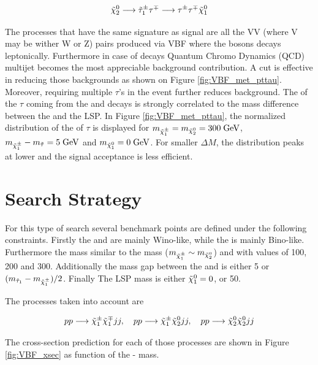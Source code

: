 \begin{equation}
\tilde{\chi}^{0}_{2} \longrightarrow \tilde{\tau}_{1}^{\pm} \tau^{\mp} \longrightarrow \tau^{\pm} \tau^{\mp} \tilde{\chi}^{0}_{1}
\end{equation}

The processes that have the same signature as signal are all the VV (where V may be wither W or Z) pairs produced via VBF where the bosons decays leptonically. Furthermore in case of \hadtau decays Quantum Chromo Dynamics (QCD) multijet becomes the most appreciable background contribution. A \met cut is eﬀective in reducing those backgrounds as shown on Figure \ref{fig:VBF_met_pttau}. Moreover, requiring multiple $\tau$’s in the event further reduces background. The \pt of the \ensuremath{\tau} coming from the \charginopm and \neutralinotwo decays is strongly correlated to the mass difference between the \charginopm and the \neutralinoone LSP. In Figure \ref{fig:VBF_met_pttau}, the normalized distribution of the \pt of \ensuremath{\tau} is displayed for \ensuremath{m_{\charginopm} = m_{\neutralinotwo} = 300\gev}, \ensuremath{m_{\charginopm} - m_{\tilde{\tau}} = 5\gev} and \ensuremath{m_{\neutralinoone} = 0\gev}. For smaller \ensuremath{\Delta M}, the distribution peaks at lower \pt and the signal acceptance is less efficient.

\section {Search Strategy}
\label{section::search_strategy}

For this type of search several benchmark points are defined under the following constraints. Firstly the \charginopm and \neutralinotwo are mainly Wino-like, while the \neutralinoone is mainly Bino-like. Furthermore the \charginomp mass similar to the \neutralinotwo mass ($m_{\tilde{\chi}^{\pm}_{1}} \sim m_{\tilde{\chi}^{0}_{2}}$) and with values of 100, 200 and 300\gev. Additionally the mass gap between the \stau and \charginopm is either 5 \gev or $(m_{\tilde{\tau}_{1}} - m_{\tilde{\chi}^{\pm}_{1}})/2$. Finally The LSP mass is either $\tilde{\chi}^{0}_{1} = 0$, or 50\gev.

The processes taken into account are

\begin{equation}
pp \longrightarrow \tilde{\chi}^{\pm}_{1} \tilde{\chi}^{\mp}_{1} jj, \quad pp \longrightarrow \tilde{\chi}^{\pm}_{1} \tilde{\chi}^{0}_{2} jj, \quad pp \longrightarrow \tilde{\chi}^{0}_{2} \tilde{\chi}^{0}_{2} jj
\end{equation}

The cross-section prediction for each of those processes are shown in Figure \ref{fig:VBF_xsec} as function of the \charginomp - \neutralinotwo mass.

